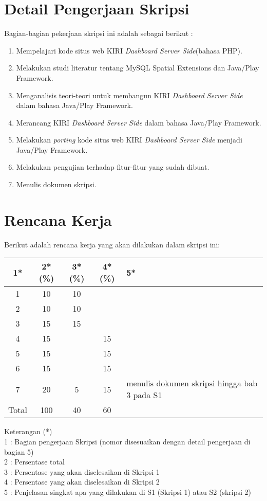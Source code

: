 \documentclass[a4paper,twoside]{article}
\begin{document}
\section{Detail Pengerjaan Skripsi}
Bagian-bagian pekerjaan skripsi ini adalah sebagai berikut :
	\begin{enumerate}
		\item Mempelajari kode situs web KIRI \textit{Dashboard Server Side}(bahasa PHP).
		\item Melakukan studi literatur tentang MySQL Spatial Extensions dan Java/Play Framework.
		\item Menganalisis teori-teori untuk membangun KIRI \textit{Dashboard Server Side} dalam bahasa Java/Play Framework.
		\item Merancang KIRI \textit{Dashboard Server Side} dalam bahasa Java/Play Framework.
		\item Melakukan \textit{porting} kode situs web KIRI \textit{Dashboard Server Side} menjadi Java/Play Framework.
		\item Melakukan pengujian terhadap fitur-fitur yang sudah dibuat.
		\item Menulis dokumen skripsi.
	\end{enumerate}

\section{Rencana Kerja}
Berikut adalah rencana kerja yang akan dilakukan dalam skripsi ini:
\begin{center}
  \begin{tabular}{ | c | c | c | c | l |}
    \hline
    1*  & 2*(\%) & 3*(\%) & 4*(\%) &5*\\ \hline \hline
    1   & 10 & 10 &  	 & \\ \hline
    2   & 10 & 10 &  	 & \\ \hline
    3   & 15 & 15 &  	 & \\ \hline
    4   & 15 &    & 15 & \\ \hline
    5   & 15 &    & 15 & \\ \hline
    6   & 15 &    & 15 & \\ \hline
    7   & 20 & 5  & 15 & {\footnotesize menulis dokumen skripsi hingga bab 3 pada S1} \\ \hline
    Total&100& 40 & 60 & \\ \hline
  \end{tabular}
\end{center}

Keterangan (*)\\
1 : Bagian pengerjaan Skripsi (nomor disesuaikan dengan detail pengerjaan di bagian 5)\\
2 : Persentase total \\
3 : Persentase yang akan diselesaikan di Skripsi 1 \\
4 : Persentase yang akan diselesaikan di Skripsi 2 \\
5 : Penjelasan singkat apa yang dilakukan di S1 (Skripsi 1) atau S2 (skripsi 2)
\end{document}
